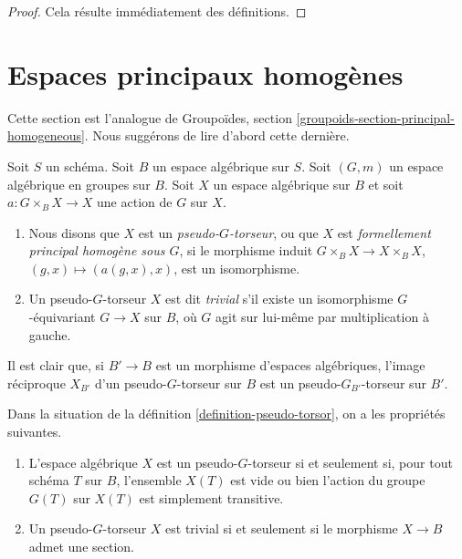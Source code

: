 \begin{proof}
Cela résulte immédiatement des définitions.
\end{proof}









\section{Espaces principaux homogènes}
\label{section-principal-homogeneous}

\noindent
Cette section est l'analogue de Groupoïdes, section \ref{groupoids-section-principal-homogeneous}. Nous suggérons de lire d'abord cette dernière.

\begin{definition}
\label{definition-pseudo-torsor}
Soit $S$ un schéma. Soit $B$ un espace algébrique sur $S$. Soit $(G, m)$ un espace algébrique en groupes sur $B$. Soit $X$ un espace algébrique sur $B$ et soit $a : G \times_B X \to X$ une action de $G$ sur $X$.
\begin{enumerate}
\item Nous disons que $X$ est un {\it pseudo-$G$-torseur}, ou que $X$ est {\it formellement principal homogène sous $G$}, si le morphisme induit $G \times_B X \to X \times_B X$, $(g, x) \mapsto (a(g, x), x)$, est un isomorphisme.
\item Un pseudo-$G$-torseur $X$ est dit {\it trivial} s'il existe un isomorphisme $G$-équivariant $G \to X$ sur $B$, où $G$ agit sur lui-même par multiplication à gauche.
\end{enumerate}
\end{definition}

\noindent
Il est clair que, si $B' \to B$ est un morphisme d'espaces algébriques, l'image réciproque $X_{B'}$ d'un pseudo-$G$-torseur sur $B$ est un pseudo-$G_{B'}$-torseur sur $B'$.

\begin{lemma}
\label{lemma-characterize-trivial-pseudo-torsors}
Dans la situation de la définition \ref{definition-pseudo-torsor}, on a les propriétés suivantes.
\begin{enumerate}
\item L'espace algébrique $X$ est un pseudo-$G$-torseur si et seulement si, pour tout schéma $T$ sur $B$, l'ensemble $X(T)$ est vide ou bien l'action du groupe $G(T)$ sur $X(T)$ est simplement transitive.
\item Un pseudo-$G$-torseur $X$ est trivial si et seulement si le morphisme $X \to B$ admet une section.
\end{enumerate}
\end{lemma}

